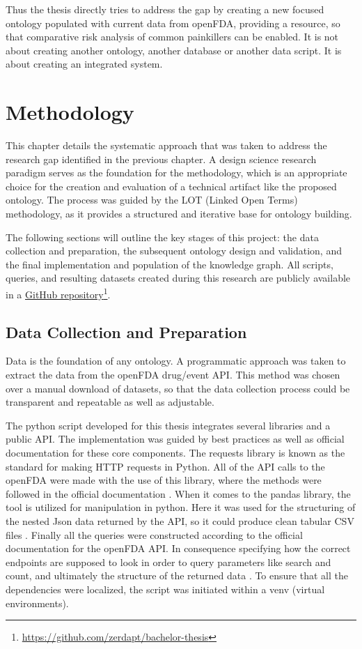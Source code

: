 Thus the thesis directly tries to address the gap by creating a new focused ontology populated with current data from openFDA, providing a resource, so that comparative risk analysis of common painkillers can be enabled. It is not about creating another ontology, another database or another data script. It is about creating an integrated system. 
\section{Methodology}
This chapter details the systematic approach that was taken to address the research gap identified in the previous chapter. A design science research paradigm serves as the foundation for the methodology, which is an appropriate choice for the creation and evaluation of a technical artifact like the proposed ontology. The process was guided by the LOT (Linked Open Terms) methodology, as it provides a structured and iterative base for ontology building.

The following sections will outline the key stages of this project: the data collection and preparation, the subsequent ontology design and validation, and the final implementation and population of the knowledge graph. All scripts, queries, and resulting datasets created during this research are publicly available in a \href{https://github.com/zerdapt/bachelor-thesis}{GitHub repository}\footnote{\url{https://github.com/zerdapt/bachelor-thesis}}.
\subsection{Data Collection and Preparation}
Data is the foundation of any ontology. A programmatic approach was taken to extract the data from the openFDA drug/event API. This method was chosen over a manual download of datasets, so that the data collection process could be transparent and repeatable as well as adjustable. 

The python script developed for this thesis integrates several libraries and a public API. The implementation was guided by best practices as well as official documentation for these core components. The requests library is known as the standard for making HTTP requests in Python. All of the API calls to the openFDA were made with the use of this library, where the methods were followed in the official documentation \cite{requestsDocumentationHHTPForHumans}. When it comes to the pandas library, the tool is utilized for manipulation in python. Here it was used for the structuring of the nested Json data returned by the API, so it could produce clean tabular CSV files \cite{pandasDocumentation}. Finally all the queries were constructed according to the official documentation for the openFDA API. In consequence specifying how the correct endpoints are supposed to look in order to query parameters like search and count, and ultimately the structure of the returned data \cite{openFDA_API}. To ensure that all the dependencies were localized, the script was initiated within a venv (virtual environments).

